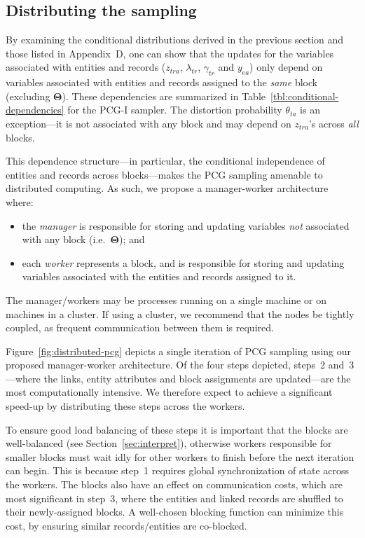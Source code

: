 \documentclass[12pt,letterpaper]{article}
\renewcommand\vec{\bm}
\newcommand{\1}[1]{\mathbb{I}\!\left[#1\right]} %
\begin{document}
\subsection{Distributing the sampling}
\label{sec:distributed-pcg}
By examining the conditional distributions derived in the previous 
section and those listed in Appendix~D, one can show that the 
updates for the variables associated with entities and records 
($z_{tra}$, $\lambda_{tr}$, $\gamma_{tr}$ and $y_{ea}$) only depend 
on variables associated with entities and records assigned to the 
\emph{same} block (excluding $\vec{\Theta}$).
These dependencies are summarized in 
Table~\ref{tbl:conditional-dependencies} for the PCG-I sampler.
The distortion probability $\theta_{ta}$ is an exception---it is 
not associated with any block and may depend on $z_{tra}$'s across 
\emph{all} blocks.

This dependence structure---in particular, the conditional 
independence of entities and records across blocks---makes the 
PCG sampling amenable to distributed computing.
As such, we propose a manager-worker architecture where: 
\begin{itemize}
  \item the \emph{manager} is responsible for storing and 
  updating variables \emph{not} associated with any 
  block (i.e.\ $\vec{\Theta}$); and
  \item each \emph{worker} represents a block, and is 
  responsible for storing and updating variables associated 
  with the entities and records assigned to it.
\end{itemize}
The manager\slash workers may be processes running on a single machine 
or on machines in a cluster.
If using a cluster, we recommend that the nodes be tightly 
coupled, as frequent communication between them is required.

Figure~\ref{fig:distributed-pcg} depicts a single 
iteration of PCG sampling using our proposed 
manager-worker architecture. 
Of the four steps depicted, steps~2 and~3---where the links, 
entity attributes and block assignments are updated---are the most 
computationally intensive. 
We therefore expect to achieve a significant speed-up by 
distributing these steps across the workers.

To ensure good load balancing of these steps it is important 
that the blocks are well-balanced (see Section~\ref{sec:interpret}), 
otherwise workers responsible for smaller blocks must wait idly 
for other workers to finish before the next iteration can begin. 
This is because step~1 requires global synchronization of state 
across the workers.
The blocks also have an effect on communication costs, which 
are most significant in step~3, where the entities and linked records 
are shuffled to their newly-assigned blocks.
A well-chosen blocking function can minimize this cost, by ensuring 
similar records\slash entities are co-blocked.
\end{document}
